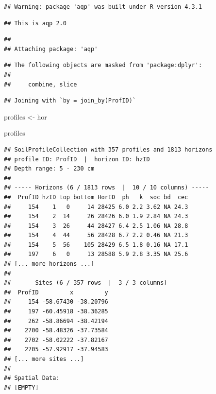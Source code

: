 \documentclass[
  10pt,
  b5paper,
  oneside]{book}
\newenvironment{Shaded}{\begin{snugshade}}{\end{snugshade}}
\newcommand{\FunctionTok}[1]{\textcolor[rgb]{0.00,0.00,0.00}{#1}}
\newcommand{\NormalTok}[1]{#1}
\newcommand{\OtherTok}[1]{\textcolor[rgb]{0.56,0.35,0.01}{#1}}
\newcommand{\SpecialCharTok}[1]{\textcolor[rgb]{0.00,0.00,0.00}{#1}}
\begin{document}
\begin{verbatim}
## Warning: package 'aqp' was built under R version 4.3.1
\end{verbatim}

\begin{verbatim}
## This is aqp 2.0
\end{verbatim}

\begin{verbatim}
## 
## Attaching package: 'aqp'
\end{verbatim}

\begin{verbatim}
## The following objects are masked from 'package:dplyr':
## 
##     combine, slice
\end{verbatim}

\begin{Shaded}
\end{Shaded}

\begin{verbatim}
## Joining with `by = join_by(ProfID)`
\end{verbatim}

\begin{Shaded}
\begin{Highlighting}[]
\NormalTok{profiles }\OtherTok{\textless{}{-}}\NormalTok{ hor}

\NormalTok{profiles}
\end{Highlighting}
\end{Shaded}

\begin{verbatim}
## SoilProfileCollection with 357 profiles and 1813 horizons
## profile ID: ProfID  |  horizon ID: hzID 
## Depth range: 5 - 230 cm
## 
## ----- Horizons (6 / 1813 rows  |  10 / 10 columns) -----
##  ProfID hzID top bottom HorID  ph   k  soc bd  cec
##     154    1   0     14 28425 6.0 2.2 3.62 NA 24.3
##     154    2  14     26 28426 6.0 1.9 2.84 NA 24.3
##     154    3  26     44 28427 6.4 2.5 1.06 NA 28.8
##     154    4  44     56 28428 6.7 2.2 0.46 NA 21.3
##     154    5  56    105 28429 6.5 1.8 0.16 NA 17.1
##     197    6   0     13 28588 5.9 2.8 3.35 NA 25.6
## [... more horizons ...]
## 
## ----- Sites (6 / 357 rows  |  3 / 3 columns) -----
##  ProfID         x         y
##     154 -58.67430 -38.20796
##     197 -60.45918 -38.36285
##     262 -58.86694 -38.42194
##    2700 -58.48326 -37.73584
##    2702 -58.02222 -37.82167
##    2705 -57.92917 -37.94583
## [... more sites ...]
## 
## Spatial Data:
## [EMPTY]
\end{verbatim}
\end{document}
